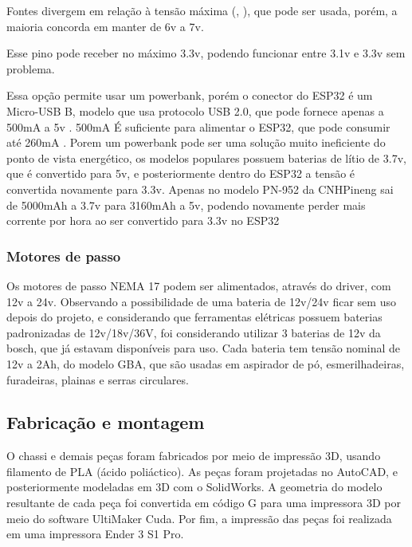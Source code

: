 
Fontes divergem em relação à tensão máxima (\cite{esp32_reference_power_supply_1}, \cite{esp32_reference_power_supply_2}),
que pode ser usada, porém, a maioria concorda em manter de 6v a 7v.

Esse pino pode receber no máximo 3.3v, podendo funcionar entre 3.1v e 3.3v sem problema.

Essa opção permite usar um powerbank, porém o conector do ESP32 é um Micro-USB B, modelo que usa protocolo USB 2.0, que pode fornece apenas a 500mA a 5v \cite{micro_usb_b}.
500mA É suficiente para alimentar o ESP32, que pode consumir até 260mA \cite{esp_max_current}.
Porem um powerbank pode ser uma solução muito ineficiente do ponto de vista energético, os modelos populares possuem baterias de lítio de 3.7v, que é convertido para 5v,
e posteriormente dentro do ESP32 a tensão é convertida novamente para 3.3v. Apenas no modelo PN-952 da CNHPineng sai de 5000mAh a 3.7v  para 3160mAh a 5v,
podendo novamente perder mais corrente por hora ao ser convertido para 3.3v no ESP32

\subsubsection{Motores de passo}

Os motores de passo NEMA 17 podem ser alimentados, através do driver, com 12v a 24v.
Observando a possibilidade de uma bateria de 12v/24v ficar sem uso depois do projeto,
e considerando que ferramentas elétricas possuem baterias padronizadas de 12v/18v/36V, foi considerando utilizar 3 baterias de 12v da bosch, que já estavam disponíveis para uso.
Cada bateria tem tensão nominal de 12v a 2Ah, do modelo GBA, que são usadas em aspirador de pó, esmerilhadeiras, furadeiras, plainas e serras circulares.




\subsection{Fabricação e montagem}
O chassi e demais peças foram fabricados por meio de impressão 3D, usando filamento de PLA (ácido poliáctico). As
peças foram projetadas no AutoCAD, e posteriormente modeladas em 3D com o SolidWorks. A geometria do modelo
resultante de cada peça foi convertida em código G para uma impressora 3D por meio do software UltiMaker Cuda. Por
fim, a impressão das peças foi realizada em uma impressora Ender 3 S1 Pro.



